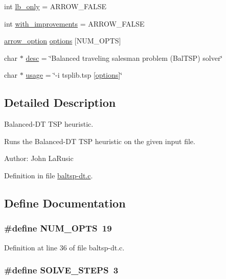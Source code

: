 \begin{CompactItemize}
\item 
int \hyperlink{bin_2baltsp-dt_8c_f328dea7847a1b1888dc14a570d0ec45}{lb\_\-only} = ARROW\_\-FALSE
\item 
int \hyperlink{bin_2baltsp-dt_8c_91079460b00ac08193d5ee47094f8f70}{with\_\-improvements} = ARROW\_\-FALSE
\item 
\hyperlink{structarrow__option}{arrow\_\-option} \hyperlink{bin_2baltsp-dt_8c_cea6a9709d519c143f30db401a0d0c72}{options} \mbox{[}NUM\_\-OPTS\mbox{]}
\item 
char $\ast$ \hyperlink{bin_2baltsp-dt_8c_3aad16fd4bea1b9717f232ea75ad6449}{desc} = \char`\"{}Balanced traveling salesman problem (BalTSP) solver\char`\"{}
\item 
char $\ast$ \hyperlink{bin_2baltsp-dt_8c_adebe2487a2c5240ab6cd02c83add0bf}{usage} = \char`\"{}-i tsplib.tsp \mbox{[}\hyperlink{tourinfo_8c_cea6a9709d519c143f30db401a0d0c72}{options}\mbox{]}\char`\"{}
\end{CompactItemize}


\subsection{Detailed Description}
Balanced-DT TSP heuristic. 

Runs the Balanced-DT TSP heuristic on the given input file.

\begin{Desc}
\item[Author:]John LaRusic \end{Desc}


Definition in file \hyperlink{bin_2baltsp-dt_8c-source}{baltsp-dt.c}.

\subsection{Define Documentation}
\hypertarget{bin_2baltsp-dt_8c_9b58b2c4af931c8486a986c9deca40f5}{
\subsubsection[{NUM\_\-OPTS}]{\setlength{\rightskip}{0pt plus 5cm}\#define NUM\_\-OPTS~19}}
\label{bin_2baltsp-dt_8c_9b58b2c4af931c8486a986c9deca40f5}




Definition at line 36 of file baltsp-dt.c.\hypertarget{bin_2baltsp-dt_8c_ceebcce8f411269df7b99e78247d7497}{
\subsubsection[{SOLVE\_\-STEPS}]{\setlength{\rightskip}{0pt plus 5cm}\#define SOLVE\_\-STEPS~3}}
\label{bin_2baltsp-dt_8c_ceebcce8f411269df7b99e78247d7497}




